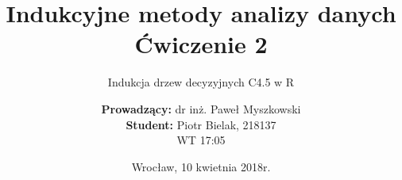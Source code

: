 \documentclass{scrartcl}
\title{Indukcyjne metody analizy danych\\Ćwiczenie 2}
\subtitle{Indukcja drzew decyzyjnych C4.5 w R}
\author{\textbf{Prowadzący:} dr inż. Paweł Myszkowski \\ \textbf{Student:} Piotr Bielak, 218137\\WT 17:05}
\date{Wrocław, 10 kwietnia 2018r.}
\begin{document}
\nocite{*}
\maketitle

\pagebreak
\tableofcontents

\pagebreak




\end{document}
